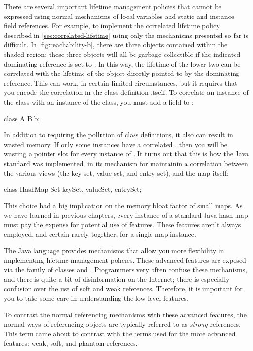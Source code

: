 There are several important lifetime management policies that cannot be expressed
using normal mechanisms of local variables and static and instance field
references. For example, to implement the correlated lifetime policy described in
\autoref{sec:correlated-lifetime} using only the mechanisms presented so far is
difficult. In \autoref{fig:reachability-b}, there are three objects contained
within the shaded region; these three objects will all be garbage collectible if
the indicated dominating reference is set to . In this way, the
lifetime of the lower two can be correlated with the lifetime of the object
directly pointed to by the dominating reference. This can work, in certain
limited circumstances, but it requires that you encode the correlation in the
class definition itself. To correlate an instance of the  class with an
instance of the  class, you must add a field to :
\begin{shortlisting}
class A {
   B b;
}
\end{shortlisting}
In addition to requiring the pollution of class definitions, it also can result
in wasted memory. If only some  instances have a correlated ,
then you will be wasting a pointer slot for every instance of . It turns
out that this is how the Java standard  was implemented, in its
mechanism for maintainin a correlation between the various views (the key set,
value set, and entry set), and the map itself:
\begin{shortlisting}
class HashMap {
   Set keySet, valueSet, entrySet;
}
\end{shortlisting}
This choice had a big implication on the memory bloat factor of small maps. As
we have learned in previous chapters, every instance of a standard Java hash map
must pay the expense for potential use of features. These features aren't
always employed, and certain rarely together, for a single map instance.

The Java language provides mechanisms that allow you more flexibility in
implementing lifetime management policies. These advanced features are exposed
via the  family of classes and \tls. Programmers
very often confuse these mechanisms, and there is quite a bit of disinformation
on the Internet; there is especially confusion over the use of soft and weak
references. Therefore, it is important for you to take some care in understanding
the low-level features.

To contrast the normal referencing mechanisms with these advanced features, the
normal ways of referencing objects are typically referred to as \emph{strong}
references. This term came about to contrast with the terms used for the more
advanced features: weak, soft, and phantom references.

